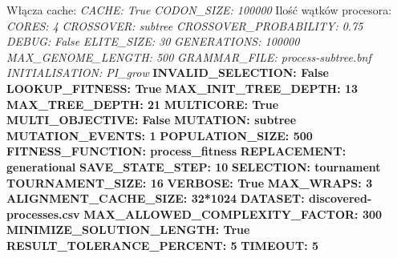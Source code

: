 Włącza cache: \newline
\textit{CACHE:                         True} \newline
\textit{CODON\_SIZE:                   100000} \newline
Ilość wątków procesora:
\textit{CORES:                         4} \newline
\textit{CROSSOVER:                     subtree} \newline
\textit{CROSSOVER\_PROBABILITY:         0.75} \newline
\textit{DEBUG:                         False} \newline
\textit{ELITE\_SIZE:                   30} \newline
\textit{GENERATIONS:                   100000} \newline
\textit{MAX\_GENOME\_LENGTH:           500} \newline
\textit{GRAMMAR\_FILE:                  process-subtree.bnf} \newline
\textit{INITIALISATION:                 PI\_grow} \newline
\textbf{INVALID\_SELECTION:              False} \newline
\textbf{LOOKUP\_FITNESS:                 True} \newline
\textbf{MAX\_INIT\_TREE\_DEPTH:            13} \newline
\textbf{MAX\_TREE\_DEPTH:                 21} \newline
\textbf{MULTICORE:                      True} \newline
\textbf{MULTI\_OBJECTIVE:                False} \newline
\textbf{MUTATION:                       subtree} \newline
\textbf{MUTATION\_EVENTS:                1} \newline
\textbf{POPULATION\_SIZE:                500} \newline
\textbf{FITNESS\_FUNCTION:               process\_fitness} \newline
\textbf{REPLACEMENT:                    generational} \newline
\textbf{SAVE\_STATE\_STEP:                10} \newline
\textbf{SELECTION:                      tournament} \newline
\textbf{TOURNAMENT\_SIZE:                16} \newline
\textbf{VERBOSE:                        True} \newline
\textbf{MAX\_WRAPS:                      3} \newline
\textbf{ALIGNMENT\_CACHE\_SIZE:           32*1024} \newline
\textbf{DATASET:                        discovered-processes.csv} \newline
\textbf{MAX\_ALLOWED\_COMPLEXITY\_FACTOR:  300} \newline
\textbf{MINIMIZE\_SOLUTION\_LENGTH:       True} \newline
\textbf{RESULT\_TOLERANCE\_PERCENT:       5} \newline
\textbf{TIMEOUT:                        5} \newline

